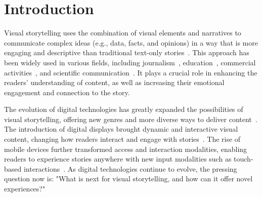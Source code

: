 \section{Introduction}
Visual storytelling uses the combination of visual elements and narratives to communicate complex ideas (e.g., data, facts, and opinions) in a way that is more engaging and descriptive than traditional text-only stories~\cite{kulkarni2023innovating}. 
This approach has been widely used in various fields, including journalism~\cite{nyt, wapo, guardian}, education~\cite{Williams2019Attending, Baharuddin2023The}, commercial activities~\cite{Moin2020Storytelling, Zhou2005VISUAL}, and scientific communication~\cite{Ma2012Scientific}. It plays a crucial role in enhancing the readers' understanding of content, as well as increasing their emotional engagement and connection to the story.


The evolution of digital technologies has greatly expanded the possibilities of visual storytelling, offering new genres and more diverse ways to deliver content~\cite{segel2010narrative}. 
The introduction of digital displays brought dynamic and interactive visual content, changing how readers interact and engage with stories~\cite{Yu2018A, Greussing2020Learning}. 
The rise of mobile devices further transformed access and interaction modalities, enabling readers to experience stories anywhere with new input modalities such as touch-based interactions~\cite{Lima2020Sketch-Based,Sheremetieva2022Touch}.
As digital technologies continue to evolve, the pressing question now is: "What is next for visual storytelling, and how can it offer novel experiences?"


